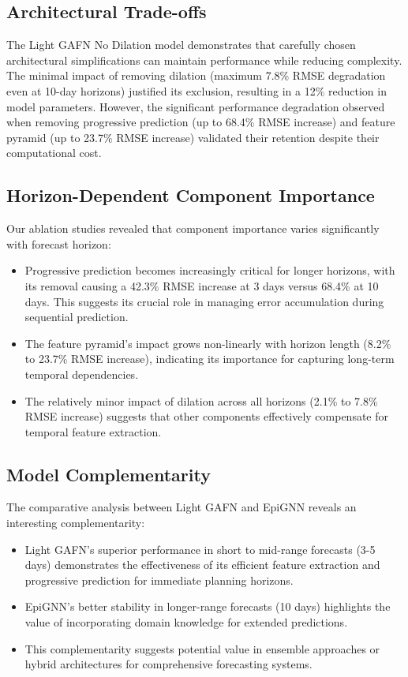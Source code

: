 \documentclass[lettersize, journal]{IEEEtran}
\begin{document}
\subsection{Architectural Trade-offs}
The Light GAFN No Dilation model demonstrates that carefully chosen architectural simplifications can maintain performance while reducing complexity. The minimal impact of removing dilation (maximum 7.8\% RMSE degradation even at 10-day horizons) justified its exclusion, resulting in a 12\% reduction in model parameters. However, the significant performance degradation observed when removing progressive prediction (up to 68.4\% RMSE increase) and feature pyramid (up to 23.7\% RMSE increase) validated their retention despite their computational cost.

\subsection{Horizon-Dependent Component Importance}
Our ablation studies revealed that component importance varies significantly with forecast horizon:
\begin{itemize}
    \item Progressive prediction becomes increasingly critical for longer horizons, with its removal causing a 42.3\% RMSE increase at 3 days versus 68.4\% at 10 days. This suggests its crucial role in managing error accumulation during sequential prediction.
    
    \item The feature pyramid's impact grows non-linearly with horizon length (8.2\% to 23.7\% RMSE increase), indicating its importance for capturing long-term temporal dependencies.
    
    \item The relatively minor impact of dilation across all horizons (2.1\% to 7.8\% RMSE increase) suggests that other components effectively compensate for temporal feature extraction.
\end{itemize}

\subsection{Model Complementarity}
The comparative analysis between Light GAFN and EpiGNN reveals an interesting complementarity:
\begin{itemize}
    \item Light GAFN's superior performance in short to mid-range forecasts (3-5 days) demonstrates the effectiveness of its efficient feature extraction and progressive prediction for immediate planning horizons.
    
    \item EpiGNN's better stability in longer-range forecasts (10 days) highlights the value of incorporating domain knowledge for extended predictions.
    
    \item This complementarity suggests potential value in ensemble approaches or hybrid architectures for comprehensive forecasting systems.
\end{itemize}
\end{document}
